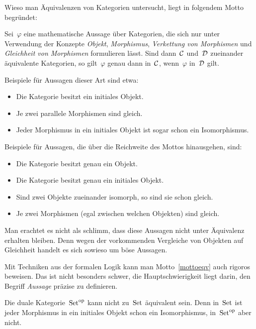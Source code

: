 Wieso man Äquivalenzen von Kategorien untersucht, liegt in folgendem
Motto begründet:
\begin{motto}\label{mottoeqv}%
Sei~$\varphi$ eine mathematische Aussage über Kategorien, die
sich nur unter Verwendung der Konzepte \emph{Objekt}, \emph{Morphismus},
\emph{Verkettung von Morphismen} und \emph{Gleichheit von Morphismen}
formulieren lässt. Sind dann~$\mathcal{C}$ und~$\mathcal{D}$ zueinander äquivalente Kategorien,
so gilt~$\varphi$ genau dann in~$\mathcal{C}$, wenn~$\varphi$ in~$\mathcal{D}$ gilt.
\end{motto}
Beispiele für Aussagen dieser Art sind etwa:
\begin{itemize}
\item Die Kategorie besitzt ein initiales Objekt.
\item Je zwei parallele Morphismen sind gleich.
\item Jeder Morphismus in ein initiales Objekt ist sogar schon ein
Isomorphismus.
\end{itemize}
Beispiele für Aussagen, die über die Reichweite des Mottos hinausgehen, sind:
\begin{itemize}
\item Die Kategorie besitzt genau ein Objekt.
\item Die Kategorie besitzt genau ein initiales Objekt.
\item Sind zwei Objekte zueinander isomorph, so sind sie schon gleich.
\item Je zwei Morphismen (egal zwischen welchen Objekten) sind gleich.
\end{itemize}
Man erachtet es nicht als schlimm, dass diese Aussagen nicht unter Äquivalenz
erhalten bleiben. Denn wegen der vorkommenden Vergleiche von Objekten auf Gleichheit
handelt es sich sowieso um böse Aussagen.

\begin{bem}Mit Techniken aus der formalen Logik kann man Motto~\ref{mottoeqv}
auch rigoros beweisen. Das ist nicht besonders schwer, die Hauptschwierigkeit
liegt darin, den Begriff \emph{Aussage} präzise zu definieren.\end{bem}

\begin{bsp}\label{setopset}%
Die duale Kategorie~$\mathrm{Set}^{\mathrm{op}}$ kann nicht zu~$\mathrm{Set}$ äquivalent sein.
Denn in~$\mathrm{Set}$ ist jeder Morphismus in ein initiales Objekt schon ein
Isomorphismus, in~$\mathrm{Set}^{\mathrm{op}}$ aber nicht.\end{bsp}


